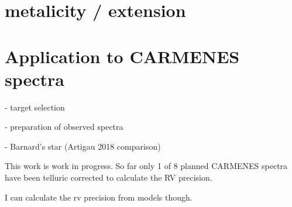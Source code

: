 \section{ metalicity / \logg{} extension}



\section{Application to {CARMENES} spectra}

- target selection

- preparation of observed spectra

- Barnard's star (Artigau 2018 comparison)


This work is work in progress.
So far only 1 of 8 planned {CARMENES} spectra have been telluric corrected to calculate the RV precision.

{I can calculate the rv precision from models though.}
